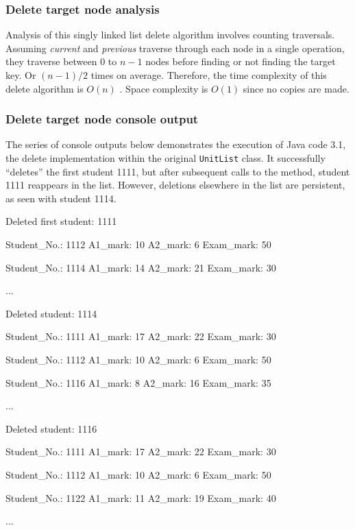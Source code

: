\subsubsection{Delete target node analysis}

Analysis of this singly linked list delete algorithm involves counting traversals. Assuming \emph{current} and \emph{previous} traverse through each node in a single operation, they traverse between 0 to $n - 1$ nodes before finding or not finding the target key. Or $(n - 1) / 2$ times on average. Therefore, the time complexity of this delete algorithm is $O(n)$ \citep[p. 83]{Watt2001}. Space complexity is $O(1)$ since no copies are made.

\subsubsection{Delete target node console output}

The series of console outputs below demonstrates the execution of Java code 3.1, the delete implementation within the original \texttt{UnitList} class. It successfully ``deletes'' the first student 1111, but after subsequent calls to the method, student 1111 reappears in the list. However, deletions elsewhere in the list are persistent, as seen with student 1114.
\\
\begin{consolecode}
Deleted first student: 1111

Student_No.: 1112
A1_mark: 10
A2_mark: 6
Exam_mark: 50

Student_No.: 1114
A1_mark: 14
A2_mark: 21
Exam_mark: 30

...
\end{consolecode}

\begin{consolecode}
Deleted student: 1114

Student_No.: 1111
A1_mark: 17
A2_mark: 22
Exam_mark: 30

Student_No.: 1112
A1_mark: 10
A2_mark: 6
Exam_mark: 50

Student_No.: 1116
A1_mark: 8
A2_mark: 16
Exam_mark: 35

...
\end{consolecode}

\begin{consolecode}
Deleted student: 1116

Student_No.: 1111
A1_mark: 17
A2_mark: 22
Exam_mark: 30

Student_No.: 1112
A1_mark: 10
A2_mark: 6
Exam_mark: 50

Student_No.: 1122
A1_mark: 11
A2_mark: 19
Exam_mark: 40

...
\end{consolecode}


